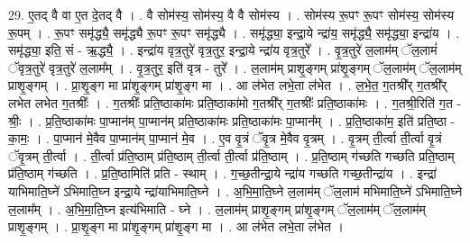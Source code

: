\documentclass[17pt]{extarticle}
\begin{document}
29. ए॒तद् वै वा ए॒त दे॒तद् वै । . वै सोम॑स्य॒ सोम॑स्य॒ वै वै सोम॑स्य । . सोम॑स्य रू॒पꣳ रू॒पꣳ सोम॑स्य॒ सोम॑स्य रू॒पम् । . रू॒पꣳ समृ॑द्ध्यै॒ समृ॑द्ध्यै रू॒पꣳ रू॒पꣳ समृ॑द्ध्यै । . समृ॑द्ध्या॒ इन्द्रा॒ये न्द्रा॑य॒ समृ॑द्ध्यै॒ समृ॑द्ध्या॒ इन्द्रा॑य । . समृ॑द्ध्या॒ इति॒ सं - ऋ॒द्ध्यै॒ । . इन्द्रा॑य वृत्र॒तुरे॑ वृत्र॒तुर॒ इन्द्रा॒ये न्द्रा॑य वृत्र॒तुरे᳚ । . वृ॒त्र॒तुरे॑ ल॒लाम॑म् ॅल॒लामं॑ ॅवृत्र॒तुरे॑ वृत्र॒तुरे॑ ल॒लाम᳚म् । . वृ॒त्र॒तुर॒ इति॑ वृत्र - तुरे᳚ । . ल॒लाम॑म् प्राशृ॒ङ्गम् प्रा॑शृ॒ङ्गम् ॅल॒लाम॑म् ॅल॒लाम॑म् प्राशृ॒ङ्गम् । . प्रा॒शृ॒ङ्ग मा प्रा॑शृ॒ङ्गम् प्रा॑शृ॒ङ्ग मा । . आ ल॑भेत लभे॒ता ल॑भेत । . ल॒भे॒त॒ ग॒तश्री᳚र् ग॒तश्री᳚र् लभेत लभेत ग॒तश्रीः᳚ । . ग॒तश्रीः᳚ प्रति॒ष्ठाका॑मः प्रति॒ष्ठाका॑मो ग॒तश्री᳚र् ग॒तश्रीः᳚ प्रति॒ष्ठाका॑मः । . ग॒तश्री॒रिति॑ ग॒त - श्रीः॒ । . प्र॒ति॒ष्ठाका॑मः पा॒प्मान॑म् पा॒प्मान॑म् प्रति॒ष्ठाका॑मः प्रति॒ष्ठाका॑मः पा॒प्मान᳚म् । . प्र॒ति॒ष्ठाका॑म॒ इति॑ प्रति॒ष्ठा - का॒मः॒ । . पा॒प्मान॑ मे॒वैव पा॒प्मान॑म् पा॒प्मान॑ मे॒व । . ए॒व वृ॒त्रं ॅवृ॒त्र मे॒वैव वृ॒त्रम् । . वृ॒त्रम् ती॒र्त्वा ती॒र्त्वा वृ॒त्रं ॅवृ॒त्रम् ती॒र्त्वा । . ती॒र्त्वा प्र॑ति॒ष्ठाम् प्र॑ति॒ष्ठाम् ती॒र्त्वा ती॒र्त्वा प्र॑ति॒ष्ठाम् । . प्र॒ति॒ष्ठाम् ग॑च्छति गच्छति प्रति॒ष्ठाम् प्र॑ति॒ष्ठाम् ग॑च्छति । . प्र॒ति॒ष्ठामिति॑ प्रति - स्थाम् । . ग॒च्छ॒तीन्द्रा॒ये न्द्रा॑य गच्छति गच्छ॒तीन्द्रा॑य । . इन्द्रा॑ याभिमाति॒घ्ने॑ ऽभिमाति॒घ्न इन्द्रा॒ये न्द्रा॑याभिमाति॒घ्ने । . अ॒भि॒मा॒ति॒घ्ने ल॒लाम॑म् ॅल॒लाम॑ मभिमाति॒घ्ने॑ ऽभिमाति॒घ्ने ल॒लाम᳚म् । . अ॒भि॒मा॒ति॒घ्न इत्य॑भिमाति - घ्ने । . ल॒लाम॑म् प्राशृ॒ङ्गम् प्रा॑शृ॒ङ्गम् ॅल॒लाम॑म् ॅल॒लाम॑म् प्राशृ॒ङ्गम् । . प्रा॒शृ॒ङ्ग मा प्रा॑शृ॒ङ्गम् प्रा॑शृ॒ङ्ग मा । . आ ल॑भेत लभे॒ता ल॑भेत । \newline
\end{document}
